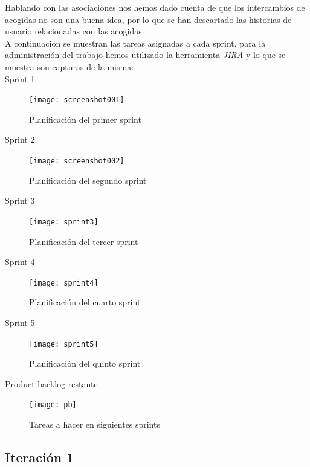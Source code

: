 Hablando con las asociaciones nos hemos dado cuenta de que los intercambios de acogidas no son una buena idea, por lo que se han descartado las historias de usuario relacionadas con las acogidas. \\

A continuación se muestran las tareas asignadas a cada sprint, para la administración del trabajo hemos utilizado la herramienta \textit{JIRA} y lo que se muestra son capturas de la misma: \\

Sprint 1 \\ 
\begin{figure}[H]
	\centering
	\texttt{[image: screenshot001]}
	\caption{Planificación del primer sprint}
	\label{fig:sprint1}
\end{figure}


Sprint 2 \\
\begin{figure}[H]
	\centering
	\texttt{[image: screenshot002]}
	\caption{Planificación del segundo sprint}
	\label{fig:sprint2}
\end{figure} 


Sprint 3 \\ 
\begin{figure}[H]
	\centering
	\texttt{[image: sprint3]}
	\caption{Planificación del tercer sprint}
	\label{fig:sprint3}
\end{figure}

Sprint 4 \\
\begin{figure}[H]
	\centering
	\texttt{[image: sprint4]}
	\caption{Planificación del cuarto sprint}
	\label{fig:sprint4}
\end{figure}

Sprint 5 \\ 
\begin{figure}[H]
	\centering
	\texttt{[image: sprint5]}
	\caption{Planificación del quinto sprint}
	\label{fig:sprint5}
\end{figure}

Product backlog restante \\
\begin{figure}[H]
	\centering
	\texttt{[image: pb]}
	\caption{Tareas a hacer en siguientes sprints}
	\label{fig:pb_restante}
\end{figure}





\subsection{Iteración 1}

